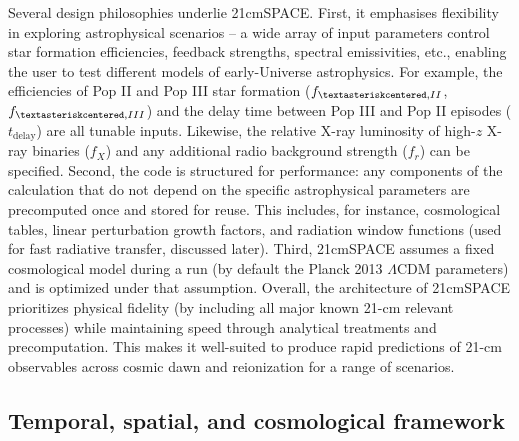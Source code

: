 \documentclass[floats,floatfix,showpacs,amssymb,prd,superscriptaddress,nofootinbib]{revtex4-2} %
\newcommand{\red}{\textcolor{red}}
\begin{document}
Several design philosophies underlie 21cmSPACE. First, it emphasises flexibility in exploring astrophysical scenarios -- a wide array of input parameters
control star formation efficiencies, feedback strengths, spectral emissivities, etc., enabling the user to test different models of early-Universe astrophysics. For example, the efficiencies of Pop II  and Pop III star formation ($f_{\textasteriskcentered,II}$, $f_{\textasteriskcentered,III}$) and the delay time between Pop III and Pop II episodes ($t_{\text{delay}}$) are all tunable inputs. Likewise, the relative X-ray luminosity of high-$z$ X-ray binaries ($f_X$) and any additional radio background strength ($f_r$) can be specified. Second, the code is structured for performance: any components of the calculation that do not depend on the specific astrophysical parameters are precomputed once and stored for reuse. This includes, for instance, cosmological tables, linear perturbation growth factors, and radiation window functions (used for fast radiative transfer, discussed later). Third, 21cmSPACE assumes a fixed cosmological model during a run (by default the Planck 2013 $\Lambda$CDM parameters) and is optimized under that assumption. 
Overall, the architecture of 21cmSPACE prioritizes physical fidelity (by including all major known 21-cm relevant processes) while maintaining speed through analytical treatments and precomputation. This makes it well-suited to produce rapid predictions of 21-cm observables across cosmic dawn and reionization for a range of scenarios.

\subsection{Temporal, spatial, and cosmological framework}
\end{document}
